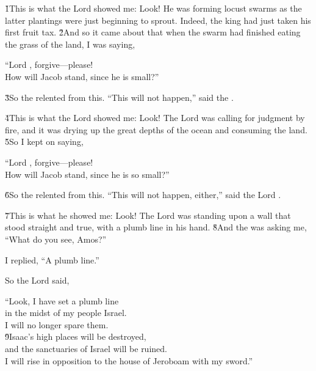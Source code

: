 \v{1}This is what the Lord  showed me: Look! He was forming locust swarms as the latter plantings were just beginning to sprout. Indeed, the king had just taken his first fruit tax. \v{2}And so it came about that when the swarm had finished eating the grass of the land, I was saying,

\begin{poetry}
\poeml ``Lord , forgive---please! \\
\poemll    How will Jacob stand, since he is small?''
\end{poetry}

\v{3}So the  relented from this. ``This will not happen,'' said the .

\v{4}This is what the Lord  showed me: Look! The Lord  was calling for judgment by fire, and it was drying up the great depths of the ocean and consuming the land. \v{5}So I kept on saying,

\begin{poetry}
\poeml ``Lord , forgive---please! \\
\poemll    How will Jacob stand, since he is so small?''
\end{poetry}

\v{6}So the  relented from this. ``This will not happen, either,'' said the Lord .

\v{7}This is what he showed me: Look! The Lord was standing upon a wall that stood straight and true, with a plumb line in his hand. \v{8}And the  was asking me, ``What do you see, Amos?''

I replied, ``A plumb line.''

So the Lord said,

\begin{poetry}
\poeml ``Look, I have set a plumb line \\
\poemll    in the midst of my people Israel. \\
\poemlll       I will no longer spare them. \\
\poeml \v{9}Isaac's high places will be destroyed, \\
\poemll    and the sanctuaries of Israel will be ruined. \\
\poemlll       I will rise in opposition to the house of Jeroboam with my sword.''
\end{poetry}

